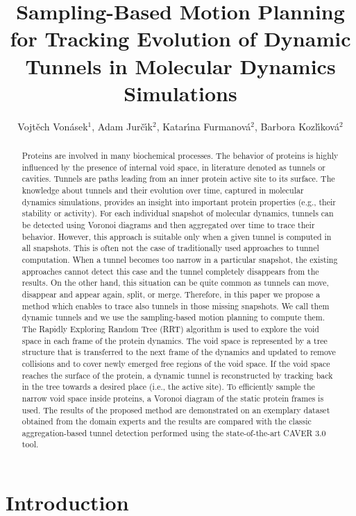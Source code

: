 \documentclass[usletter, 10pt, conference]{svjour3}      %
\title{
    Sampling-Based Motion Planning for Tracking Evolution of Dynamic Tunnels in Molecular Dynamics Simulations
}
\author{Vojt\v ech Von\' asek$^{1}$, Adam Jur\v{c}\'\i k$^{2}$, Katar\'\i na Furmanov\'a$^{2}$, Barbora Kozl\'\i kov\'a$^{2}$}
\institute{
{$^{1}$vonasek@labe.felk.cvut.cz;
Faculty of Electrical Engineering,  
Czech Technical University in Prague, 
Technick\'a 2, 166 27, Prague 6, Czech Republic}%
\and
$^{2}$ Faculty of Informatics,  
Masaryk University, 
Botanick\'a 68a, 602 00 Brno,
Czech Republic
}
\begin{document}
\maketitle


\begin{abstract}
Proteins are involved in many biochemical processes.
The behavior of proteins is highly influenced by the presence of internal void space, in literature denoted as tunnels or cavities.
Tunnels are paths leading from an inner protein active site to its surface.
The knowledge about tunnels and their evolution over time, captured in molecular dynamics simulations, provides an insight into important protein properties
(e.g., their stability or activity).
For each individual snapshot of molecular dynamics, tunnels can be detected using Voronoi diagrams and then aggregated over time to trace their behavior.
However, this approach is suitable only when a given tunnel is computed in all snapshots.
This is often not the case of traditionally used approaches to tunnel computation.
When a tunnel becomes too narrow in a particular snapshot, the existing approaches cannot detect this case and the tunnel completely disappears from the results.
On the other hand, this situation can be quite common as tunnels can move, disappear and appear again, split, or merge.
Therefore, in this paper we propose a method which enables to trace also tunnels in those missing snapshots.
We call them dynamic tunnels and we use the sampling-based motion planning to compute them.
The Rapidly Exploring Random Tree (RRT) algorithm is used to explore the void space in each frame of the protein dynamics.
The void space is represented by a tree structure that is transferred to the next frame of the dynamics and updated to remove collisions and to cover newly emerged free regions of the void space.
If the void space reaches the surface of the protein, a dynamic tunnel is reconstructed by tracking back in the tree towards a desired place (i.e., the active site).
To efficiently sample the narrow void space inside proteins, a Voronoi diagram of the static protein frames is used.
The results of the proposed method are demonstrated on an exemplary dataset obtained from the domain experts and the results are compared with the classic aggregation-based tunnel detection performed using the state-of-the-art CAVER 3.0 tool.
\end{abstract}



\section{Introduction}
\end{document}
